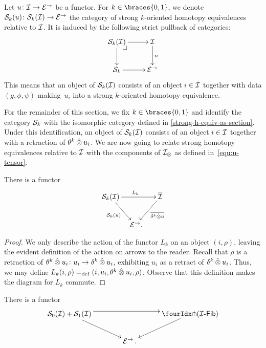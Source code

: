 \documentclass[reqno,10pt,a4paper,oneside,draft]{amsart}
\begin{document}
Let $u \co \cal{I} \to \catE^\to$ be a functor.
For $k \in \braces{0, 1}$, we denote $\cal{S}_k(u) \co \cal{S}_k(\cal{I}) \to \catE^\to$ the category of strong $k$-oriented homotopy equivalences relative to $\cal{I}$.
It is induced by the following strict pullback of categories:
\begin{equation} \label{rel-strong-h-equiv-def}
\xycenter{
  \cal{S}_k(\cal{I})
  \ar[r]
  \ar[d]
  \pullback{dr}
&
  \cal{I}
  \ar[d]^{u}
\\
  \cal{S}_k
  \ar[r]
&
  \catE^\to
}
\end{equation}
This means that an object of $\cal{S}_k(\cal{I})$ consists of an object $i \in \cal{I}$ together with data $(g, \phi, \psi)$ making~$u_i$ into a strong $k$-oriented homotopy equivalence.

For the remainder of this section, we fix $k \in \braces{0, 1}$ and identify the category $\cal{S}_k$ with the isomorphic category defined in \cref{strong-h-equiv-as-section}.
Under this identification, an object of $\cal{S}_k(\cal{I})$ consists of an object $i \in \cal{I}$ together with a retraction of $\thetak \hatotimes u_i$.
We are now going to relate strong homotopy equivalences relative to $\cal{I}$ with the components of $\cal{I}_\otimes$ as defined in~\eqref{equ:u-tensor}.

\begin{lemma} \label{lem:from-strong-hequiv}
There is a functor
\[
\xymatrix@!C@C-2em{
  \cal{S}_k(\cal{I})
  \ar[dr]_{\cal{S}_k(u)}
  \ar[rr]^{L_k}
&&
  \overline{\cal{I}}
  \ar[dl]^-{\overline{\kcyl \hatotimes u}}
\\&
  \catE^\to
\rlap{.}}
\]
\end{lemma}

\begin{proof}
We only describe the action of the functor $L_k$ on an object $(i, \rho)$, leaving the evident definition of the action on arrows to the reader.
Recall that $\rho$ is a retraction of $\thetak \hatotimes u_i \co u_i \to \kcyl \hatotimes u_i$, exhibiting $u_i$ as a retract of $\kcyl \hatotimes u_i$.
Thus, we may define $L_k(i, \rho) \defeq (i, u_i, \thetak \hatotimes u_i, \rho)$.
Observe that this definition makes the diagram for $L_k$ commute.
\end{proof}

\begin{proposition} \label{thm:onedir} There is a functor
\[
\xymatrix@!C@C-2.5em{
\cal{S}_0(\cal{I}) + \cal{S}_1(\cal{I})
  \ar[dr]
  \ar@<4pt>[rr] 
&&
  \liftl{(\Fib{\cal{I}})}
  \ar[dl]
\\&
  \catE^\to \, .
}
\]
\end{proposition}
\end{document}
